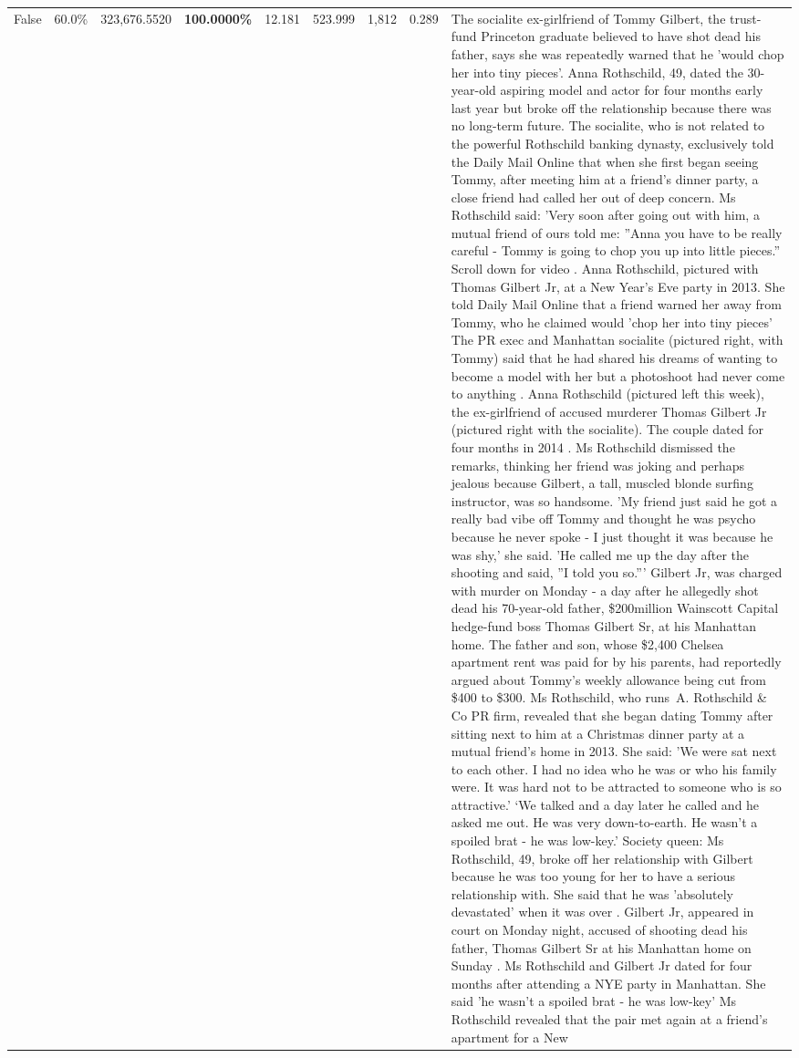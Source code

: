 \begin{table}[H]
\begin{tabular}{lllrlllll}
False & 60.0\% & 323,676.5520 & \bfseries \color{red} 100.0000\% & 12.181 & 523.999 & 1,812 & 0.289 & The socialite ex-girlfriend of Tommy Gilbert, the trust-fund Princeton graduate believed to have shot dead his father, says she was repeatedly warned that he 'would chop her into tiny pieces'. Anna Rothschild, 49, dated the 30-year-old aspiring model and actor for four months early last year but broke off the relationship because there was no long-term future. The socialite, who is not related to the powerful Rothschild banking dynasty, exclusively told the Daily Mail Online that when she first began seeing Tommy, after meeting him at a friend's dinner party, a close friend had called her out of deep concern. Ms Rothschild said: 'Very soon after going out with him, a mutual friend of ours told me: ''Anna you have to be really careful - Tommy is going to chop you up into little pieces.'' Scroll down for video . Anna Rothschild, pictured with Thomas Gilbert Jr, at a New Year's Eve party in 2013. She told Daily Mail Online that a friend warned her away from Tommy, who he claimed would 'chop her into tiny pieces' The PR exec and Manhattan socialite (pictured right, with Tommy) said that he had shared his dreams of wanting to become a model with her but a photoshoot had never come to anything . Anna Rothschild (pictured left this week), the ex-girlfriend of accused murderer Thomas Gilbert Jr (pictured right with the socialite). The couple dated for four months in 2014 . Ms Rothschild dismissed the remarks, thinking her friend was joking and perhaps jealous because Gilbert, a tall, muscled blonde surfing instructor, was so handsome. 'My friend just said he got a really bad vibe off Tommy and thought he was psycho because he never spoke - I just thought it was because he was shy,' she said. 'He called me up the day after the shooting and said, ''I told you so.''' Gilbert Jr, was charged with murder on Monday - a day after he allegedly shot dead his 70-year-old father, \$200million Wainscott Capital hedge-fund boss Thomas Gilbert Sr, at his Manhattan home. The father and son, whose \$2,400 Chelsea apartment rent was paid for by his parents, had reportedly argued about Tommy's weekly allowance being cut from \$400 to \$300. Ms Rothschild, who runs A. Rothschild \& Co PR firm, revealed that she began dating Tommy after sitting next to him at a Christmas dinner party at a mutual friend's home in 2013. She said: 'We were sat next to each other. I had no idea who he was or who his family were. It was hard not to be attracted to someone who is so attractive.' ‘We talked and a day later he called and he asked me out. He was very down-to-earth. He wasn’t a spoiled brat - he was low-key.’ Society queen: Ms Rothschild, 49, broke off her relationship with Gilbert because he was too young for her to have a serious relationship with. She said that he was 'absolutely devastated' when it was over . Gilbert Jr, appeared in court on Monday night, accused of shooting dead his father, Thomas Gilbert Sr at his Manhattan home on Sunday . Ms Rothschild and Gilbert Jr dated for four months after attending a NYE party in Manhattan. She said 'he wasn't a spoiled brat - he was low-key' Ms Rothschild revealed that the pair met again at a friend’s apartment for a New 
\end{tabular}
\end{table}
